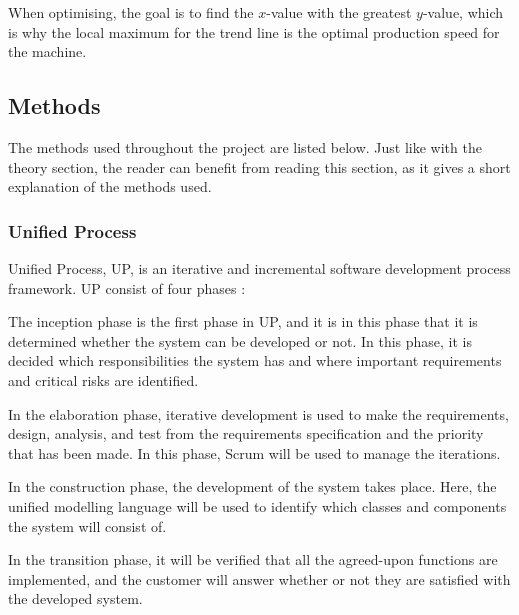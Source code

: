 When optimising, the goal is to find the \(x\)-value with the greatest
\(y\)-value, which is why the local maximum for the trend line is the optimal
production speed for the machine. 


\subsection{Methods}
The methods used throughout the project are listed below. Just like with the
theory section, the reader can benefit from reading this section, as it gives
a short explanation of the methods used.

\subsubsection{Unified Process}
Unified Process, UP, is an iterative and incremental software development
process framework. UP consist of four phases \cite{up}: 

The inception phase is the first phase in UP, and it is in this phase that it
is determined whether the system can be developed or not. In this phase, it is
decided which responsibilities the system has and where important requirements
and critical risks are identified. 

In the elaboration phase, iterative development is used to make the requirements,
design, analysis, and test from the requirements specification and the priority
that has been made. In this phase, Scrum will be used to manage the iterations.

In the construction phase, the development of the system takes place. Here, the 
unified modelling language will be used to identify which classes and components
the system will consist of. 

In the transition phase, it will be verified that all the agreed-upon
functions are implemented, and the customer will answer whether or not they are
satisfied with the developed system.


